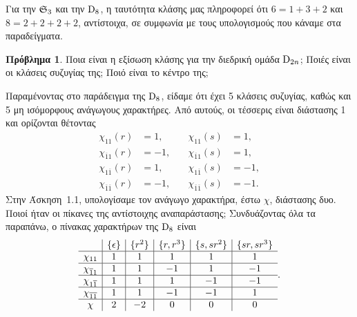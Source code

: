 \documentclass[12pt,a4paper,reqno]{amsart}
\theoremstyle{definition}
\newtheorem*{problem}{Πρόβλημα}
\begin{document}
Για την $\mathfrak{S}_3$ και την $\mathrm{D}_8$, η ταυτότητα κλάσης μας πληροφορεί ότι $6 = 1 + 3 + 2$ και $8 = 2 + 2 + 2 + 2$, αντίστοιχα, σε συμφωνία με τους υπολογισμούς που κάναμε στα παραδείγματα.

\begin{problem}
Ποια είναι η εξίσωση κλάσης για την διεδρική ομάδα $\mathrm{D}_{2n}$; Ποιές είναι οι κλάσεις συζυγίας της; Ποιό είναι το κέντρο της;
\end{problem}

Παραμένοντας στο παράδειγμα της $\mathrm{D}_8$, είδαμε ότι έχει 5 κλάσεις συζυγίας, καθώς και 5 μη ισόμορφους ανάγωγους χαρακτήρες. Από αυτούς, οι τέσσερις είναι διάστασης 1 και ορίζονται θέτοντας
\[
\begin{aligned}
\chi_{11}(r)           &=  1, &\quad \chi_{11}(s)           &=  1, \\
\chi_{\overline{1}1}(r)  &= -1, &\quad \chi_{\overline{1}1}(s)  &=  1, \\
\chi_{1\overline{1}}(r)  &=  1, &\quad \chi_{1\overline{1}}(s)  &= -1, \\
\chi_{\overline{1}\overline{1}}(r) &= -1, &\quad \chi_{\overline{1}\overline{1}}(s) &= -1.
\end{aligned}
\]
Στην Άσκηση~1.1, υπολογίσαμε τον ανάγωγο χαρακτήρα, έστω $\chi$, διάστασης δυο. Ποιοί ήταν οι πίκανες της αντίστοιχης αναπαράστασης; Συνδυάζοντας όλα τα παραπάνω, ο πίνακας χαρακτήρων της $\mathrm{D}_8$ είναι 
\[
\begin{array}{c|c|c|c|c|c}
                        & \{\epsilon\} & \{r^2\}  & \{r, r^3\} & \{s, sr^2\} & \{sr, sr^3\} \\ \hline
    \chi_{11}           & 1            & 1        & 1          & 1           & 1            \\ \hline
    \chi_{\overline{1}1}      & 1            & 1        & -1         & 1           & -1           \\ \hline    
    \chi_{1\overline{1}}      & 1            & 1        & 1          & -1          & -1           \\ \hline    
    \chi_{\overline{1}\overline{1}} & 1            & 1        & -1         & -1          & 1            \\ \hline   
    \chi                & 2            & -2        & 0         & 0          & 0            \\    
\end{array}.
\]
\end{document}
